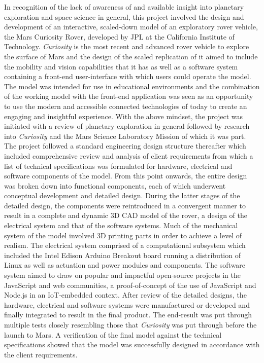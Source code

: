 In recognition of the lack of awareness of and available insight into planetary exploration and space science in general, this project involved the design and development of an interactive, scaled-down model of an exploratory rover vehicle, the Mars Curiosity Rover, developed by JPL at the California Institute of Technology. \textit{Curiosity} is the most recent and advanced rover vehicle to explore the surface of Mars and the design of the scaled replication of it aimed to include the mobility and vision capabilities that it has as well as a software system containing a front-end user-interface with which users could operate the model. The model was intended for use in educational environments and the combination of the working model with the front-end application was seen as an opportunity to use the modern and accessible connected technologies of today to create an engaging and insightful experience. With the above mindset, the project was initiated with a review of planetary exploration in general followed by research into \textit{Curiosity} and the Mars Science Laboratory Mission of which it was part. The project followed a standard engineering design structure thereafter which included comprehensive review and analysis of client requirements from which a list of technical specifications was formulated for hardware, electrical and software components of the model. From this point onwards, the entire design was broken down into functional components, each of which underwent conceptual development and detailed design. During the latter stages of the detailed design, the components were reintroduced in a convergent manner to result in a complete and dynamic 3D CAD model of the rover, a design of the electrical system and that of the software systems. Much of the mechanical system of the model involved 3D printing parts in order to achieve a level of realism. The electrical system comprised of a computational subsystem which included the Intel Edison Arduino Breakout board running a distribution of Linux as well as actuation and power modules and components. The software system aimed to draw on popular and impactful open-source projects in the JavaScript and web communities, a proof-of-concept of the use of JavaScript and Node.js in an IoT-embedded context. After review of the detailed designs, the hardware, electrical and software systems were manufactured or developed and finally integrated to result in the final product. The end-result was put through multiple tests closely resembling those that \textit{Curiosity} was put through before the launch to Mars. A verification of the final model against the technical specifications showed that the model was successfully designed in accordance with the client requirements.